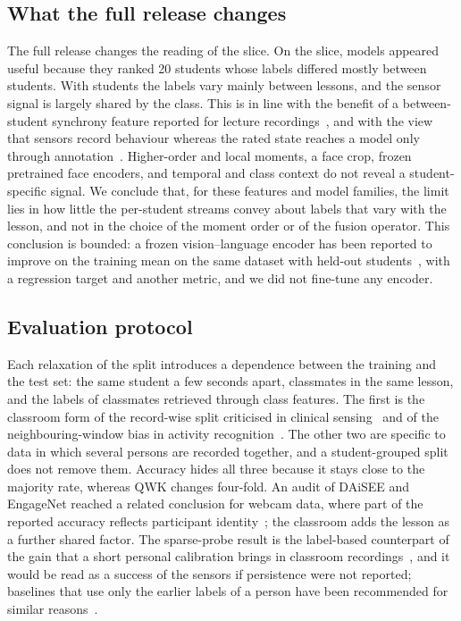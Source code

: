 \subsection{What the full release changes}
The full release changes the reading of the slice. On the slice, models appeared useful because they ranked 20 students whose labels differed mostly between students. With \fcPersons{} students the labels vary mainly between lessons, and the sensor signal is largely shared by the class. This is in line with the benefit of a between-student synchrony feature reported for lecture recordings~\cite{goldberg2021attentive}, and with the view that sensors record behaviour whereas the rated state reaches a model only through annotation~\cite{dimitri2018signals}. Higher-order and local moments, a face crop, frozen pretrained face encoders, and temporal and class context do not reveal a student-specific signal. We conclude that, for these features and model families, the limit lies in how little the per-student streams convey about labels that vary with the lesson, and not in the choice of the moment order or of the fusion operator. This conclusion is bounded: a frozen vision--language encoder has been reported to improve on the training mean on the same dataset with held-out students~\cite{fragkiadakis2026fairness}, with a regression target and another metric, and we did not fine-tune any encoder.

\subsection{Evaluation protocol}
Each relaxation of the split introduces a dependence between the training and the test set: the same student a few seconds apart, classmates in the same lesson, and the labels of classmates retrieved through class features. The first is the classroom form of the record-wise split criticised in clinical sensing~\cite{saeb2017need} and of the neighbouring-window bias in activity recognition~\cite{hammerla2015lets}. The other two are specific to data in which several persons are recorded together, and a student-grouped split does not remove them. Accuracy hides all three because it stays close to the majority rate, whereas QWK changes four-fold. An audit of DAiSEE and EngageNet reached a related conclusion for webcam data, where part of the reported accuracy reflects participant identity~\cite{le2026auditing}; the classroom adds the lesson as a further shared factor. The sparse-probe result is the label-based counterpart of the gain that a short personal calibration brings in classroom recordings~\cite{sumer2023multimodal}, and it would be read as a success of the sensors if persistence were not reported; baselines that use only the earlier labels of a person have been recommended for similar reasons~\cite{demasi2017meaningless,leng2026edugage}.

